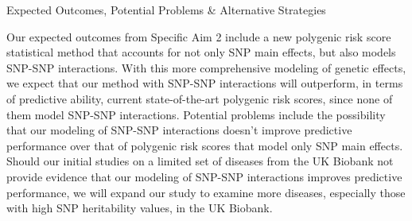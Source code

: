 \documentclass[
  letterpaper,
  DIV=11,
  numbers=noendperiod]{scrartcl}
\begin{document}
Expected Outcomes, Potential Problems \& Alternative Strategies

Our expected outcomes from Specific Aim 2 include a new polygenic risk
score statistical method that accounts for not only SNP main effects,
but also models SNP-SNP interactions. With this more comprehensive
modeling of genetic effects, we expect that our method with SNP-SNP
interactions will outperform, in terms of predictive ability, current
state-of-the-art polygenic risk scores, since none of them model SNP-SNP
interactions. Potential problems include the possibility that our
modeling of SNP-SNP interactions doesn't improve predictive performance
over that of polygenic risk scores that model only SNP main effects.
Should our initial studies on a limited set of diseases from the UK
Biobank not provide evidence that our modeling of SNP-SNP interactions
improves predictive performance, we will expand our study to examine
more diseases, especially those with high SNP heritability values, in
the UK Biobank.
\end{document}
